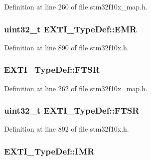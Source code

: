 Definition at line 260 of file stm32f10x\+\_\+map.\+h.

\subsubsection[{\texorpdfstring{E\+MR}{EMR}}]{ {\bf uint32\+\_\+t} E\+X\+T\+I\+\_\+\+Type\+Def\+::\+E\+MR}\hypertarget{struct_e_x_t_i___type_def_a9c5bff67bf9499933959df7eb91a1bd6}{}\label{struct_e_x_t_i___type_def_a9c5bff67bf9499933959df7eb91a1bd6}


Definition at line 890 of file stm32f10x.\+h.

\subsubsection[{\texorpdfstring{F\+T\+SR}{FTSR}}]{ E\+X\+T\+I\+\_\+\+Type\+Def\+::\+F\+T\+SR}\hypertarget{struct_e_x_t_i___type_def_ade6114dee9f209fd01d5738d57e7968b}{}\label{struct_e_x_t_i___type_def_ade6114dee9f209fd01d5738d57e7968b}


Definition at line 262 of file stm32f10x\+\_\+map.\+h.

\subsubsection[{\texorpdfstring{F\+T\+SR}{FTSR}}]{ {\bf uint32\+\_\+t} E\+X\+T\+I\+\_\+\+Type\+Def\+::\+F\+T\+SR}\hypertarget{struct_e_x_t_i___type_def_aee667dc148250bbf37fdc66dc4a9874d}{}\label{struct_e_x_t_i___type_def_aee667dc148250bbf37fdc66dc4a9874d}


Definition at line 892 of file stm32f10x.\+h.

\subsubsection[{\texorpdfstring{I\+MR}{IMR}}]{ E\+X\+T\+I\+\_\+\+Type\+Def\+::\+I\+MR}\hypertarget{struct_e_x_t_i___type_def_ae89d6fa0b34ed153e3c76e96dc2397ff}{}\label{struct_e_x_t_i___type_def_ae89d6fa0b34ed153e3c76e96dc2397ff}


